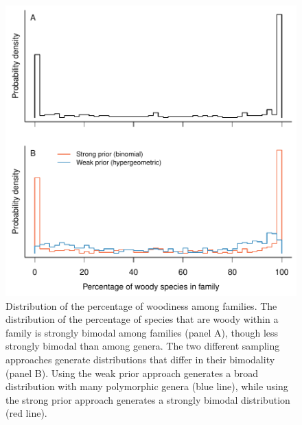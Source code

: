 \begin{figure}[p]
  \centering
  \includegraphics[width=\textwidth]{figs/fraction-by-family}
  \caption[Distribution of woodiness proportion among
  families]{Distribution of the percentage of woodiness among
    families.
    The distribution of the percentage of species that are woody within
    a family is strongly bimodal among families (panel A), though less
    strongly bimodal than among genera.
    The two different sampling approaches generate distributions that
    differ in their bimodality (panel B).  Using the weak prior
    approach generates a broad distribution with many polymorphic
    genera (blue line), while using the strong prior approach
    generates a strongly bimodal distribution (red line).}
  \label{fig:distribution-family}
\end{figure}


